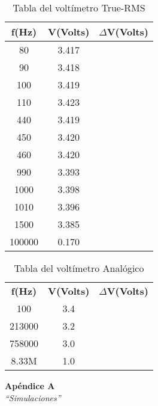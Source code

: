 \documentclass{article}
\begin{document}
\begin{table}[!hbt]
	\begin{center}
	\begin{tabular}{|c|c|c|}\hline
	\textbf{f(Hz)} & \textbf{V(Volts)} & \textbf{$\Delta$V(Volts)} \\ \hline
	80 & 3.417 &	\\ \hline
    90 & 3.418 &	\\ \hline
    100 & 3.419 &	\\ \hline
	110 & 3.423 &	\\ \hline
	440 & 3.419 &	\\ \hline
	450 & 3.420 &	\\ \hline
	460 & 3.420 &	\\ \hline
	990 & 3.393 &	\\ \hline
	1000 & 3.398 &	\\ \hline
	1010& 3.396 &	\\ \hline
	1500 & 3.385 &	\\ \hline
	100000 & 0.170 &	\\ \hline
	\end{tabular}
	\caption{Tabla del voltímetro True-RMS}
	\end{center}
\end{table}

\begin{table}[!hbt]
	\begin{center}
	\begin{tabular}{|c|c|c|}\hline
	\textbf{f(Hz)} & \textbf{V(Volts)} & \textbf{$\Delta$V(Volts)} \\
	100 & 3.4 &    \\ \hline
    213000 & 3.2 &	\\ \hline
    758000 & 3.0 &	\\ \hline
	8.33M & 1.0 &	\\ \hline
	\end{tabular}
	\caption{Tabla del voltímetro Analógico}
	\end{center}
\end{table}


\newpage
\vspace*{4cm}
\begin{center}
	\textbf{\Huge{Apéndice A}} \\
	\bigskip\bigskip
	\Large{\textit{``Simulaciones''}}
\end{center}


\newpage \textit{}
\newpage
\end{document}
